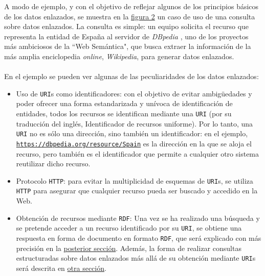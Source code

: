         \noindent A modo de ejemplo, y con el objetivo de reflejar algunos de los principios básicos de los datos enlazados, se muestra en la \hyperref[fig:linked]{figura 2} un caso de uso de una consulta sobre datos enlazados. La consulta es simple: un equipo solicita el recurso que representa la entidad de España al servidor de \textit{DBpedia} \cite{DBPEDIA}, uno de los proyectos más ambiciosos de la ``Web Semántica", que busca extraer la información de la más amplia enciclopedia \textit{online}, \textit{Wikipedia}, para generar datos enlazados.
        \\ \\
        En el ejemplo se pueden ver algunas de las peculiaridades de los datos enlazados:
        \begin{itemize}
            \item Uso de \texttt{URI}s como identificadores: con el objetivo de evitar ambigüedades y poder ofrecer una forma estandarizada y unívoca de identificación de entidades, todos los recursos se identifican mediante una \texttt{URI} (por su traducción del inglés, Identificador de recursos uniforme). Por lo tanto, una \texttt{URI} no es sólo una dirección, sino también un identificador: en el ejemplo, \texttt{\url{https://dbpedia.org/resource/Spain}} es la dirección en la que se aloja el recurso, pero también es el identificador que permite a cualquier otro sistema reutilizar dicho recurso.
            \item Protocolo \texttt{HTTP}: para evitar la multiplicidad de esquemas de \texttt{URI}s, se utiliza \texttt{HTTP} para asegurar que cualquier recurso pueda ser buscado y accedido en la Web.
            \item Obtención de recursos mediante \texttt{RDF}: Una vez se ha realizado una búsqueda y se pretende acceder a un recurso identificado por su \texttt{URI}, se obtiene una respuesta en forma de documento en formato \texttt{RDF}, que será explicado con más precisión en la \hyperref[subsubsec:RDF]{posterior sección}. Además, la forma de realizar consultas estructuradas sobre datos enlazados más allá de su obtención mediante \texttt{URI}s será descrita en \hyperref[subsubsec:SPARQL]{otra sección}.
        \end{itemize}
        
